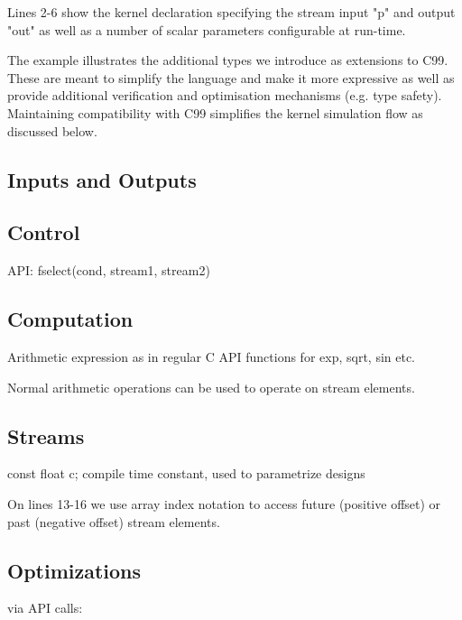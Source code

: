 Lines 2-6 show the kernel declaration specifying the stream input "p"
and output "out" as well as a number of scalar parameters configurable
at run-time.


The example illustrates the additional types we introduce as
extensions to C99. These are meant to simplify the language and make
it more expressive as well as provide additional verification and
optimisation mechanisms (e.g. type safety). Maintaining compatibility
with C99 simplifies the kernel simulation flow as discussed below.


\subsection {Inputs and Outputs}


\subsection{Control}
API: fselect(cond, stream1, stream2)

\subsection{Computation}
Arithmetic expression as in regular C
API functions for exp, sqrt, sin etc.

Normal arithmetic operations can be used to operate on stream
elements.


\subsection{Streams}


const float c;  compile time constant, used to parametrize
designs

On lines 13-16 we use array index notation to access future (positive
offset) or past (negative offset) stream elements.


\subsection{Optimizations}
via API calls:

